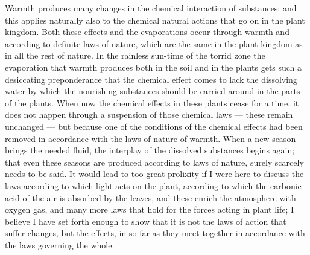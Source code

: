 \documentclass[12pt,a4paper,openany]{book}
\begin{document}
Warmth produces many changes in the chemical interaction of substances; and this
applies naturally also to the chemical natural actions that go on in the plant
kingdom. Both these effects and the evaporations occur through warmth and according
to definite laws of nature, which are the same in the plant kingdom as in all the
rest of nature. In the rainless sun-time of the torrid zone the evaporation that
warmth produces both in the soil and in the plants gets such a desiccating
preponderance that the chemical effect comes to lack the dissolving water by which
the nourishing substances should be carried around in the parts of the plants. When
now the chemical effects in these plants cease for a time, it does not happen
through a suspension of those chemical laws --- these remain unchanged --- but
because one of the conditions of the chemical effects had been removed in accordance
with the laws of nature of warmth. When a new season brings the needed fluid, the
interplay of the dissolved substances begins again; that even these seasons are
produced according to laws of nature, surely scarcely needs to be said. It would
lead to too great prolixity if I were here to discuss the laws according to which
light acts on the plant, according to which the carbonic acid of the air is absorbed
by the leaves, and these enrich the atmosphere with oxygen gas, and many more laws
that hold for the forces acting in plant life; I believe I have set forth enough to
show that it is not the laws of action that suffer changes, but the effects, in so
far as they meet together in accordance with the laws governing the whole.
\end{document}

